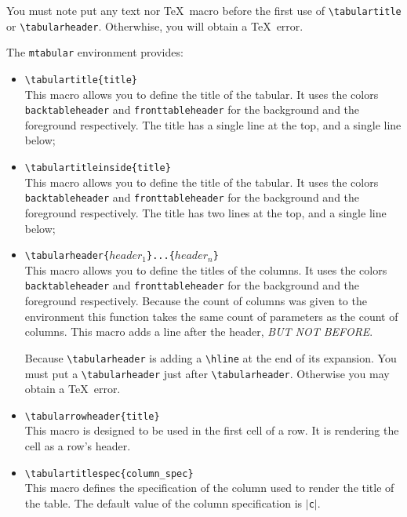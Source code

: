 \documentclass[book]{upmethodology-document}
\begin{document}
\begin{upmcaution}
	You must note put any text nor \TeX\ macro before the first use of \texttt{{\textbackslash}tabulartitle} or \texttt{{\textbackslash}tabularheader}. Otherwhise, you will obtain a \TeX\ error.
\end{upmcaution}


The \texttt{mtabular} environment provides:
\begin{itemize}
\item \texttt{{\textbackslash}tabulartitle\{title\}} \\
	This macro allows you to define the title of the tabular. It uses the colors \texttt{backtableheader} and \texttt{fronttableheader} for the background and the foreground respectively. The title has a single line at the top, and a single line below;

\item \texttt{{\textbackslash}tabulartitleinside\{title\}} \\
	This macro allows you to define the title of the tabular. It uses the colors \texttt{backtableheader} and \texttt{fronttableheader} for the background and the foreground respectively. The title has two lines at the top, and a single line below;

\item \texttt{{\textbackslash}tabularheader\{$header_1$\}...\{$header_n$\}} \\
	This macro allows you to define the titles of the columns. It uses the colors \texttt{backtableheader} and \texttt{fronttableheader} for the background and the foreground respectively. Because the count of columns was given to the environment this function takes the same count of parameters as the count of columns. This macro adds a line after the header, \emph{BUT NOT BEFORE}.
\begin{upmcaution}
	Because \texttt{{\textbackslash}tabularheader} is adding a \texttt{{\textbackslash}hline} at the end of its expansion. You must put a \texttt{{\textbackslash}tabularheader} just after \texttt{{\textbackslash}tabularheader}. Otherwise you may obtain a \TeX\ error.
\end{upmcaution}

\item \texttt{{\textbackslash}tabularrowheader\{title\}} \\
	This macro is designed to be used in the first cell of a row. It is rendering the cell as a row's header.

\item \texttt{{\textbackslash}tabulartitlespec\{column\_spec\}} \\
	This macro defines the specification of the column used to render the title of the table.
	The default value of the column specification is $|$\texttt{c}$|$.

\end{itemize}
\end{document}
